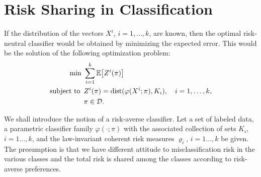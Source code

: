 \documentclass[10pt,letterpaper]{article}
\newcommand{\1}{1{\hskip -2.55 pt}\hbox{I}}
\newcommand{\dist}{\mathop{\rm dist}}
\begin{document}


\section{Risk Sharing in Classification} %
\label{sec:risk_sharing_in_classification}


If the distribution of the vectors $X^i$, $i=1,\dots, k$, are known, then the optimal risk-neutral classifier would be obtained by minimizing the expected error. 
This would be the solution of the following optimization problem:
\begin{equation}
\label{p:general-E}
\begin{aligned}
\min\, &\, \sum_{i=1}^k \mathbb E\big[ Z^i(\pi)\big]\\
\text{subject to } &\, Z^i(\pi) = \dist(\varphi(X^i;\pi),{K_i}),\quad i=1,\dots, k,\\
&\, \pi\in\mathcal D.
\end{aligned}
\end{equation}

We shall introduce the notion of a risk-averse classifier. Let a set of labeled data, a parametric classifier family
$\varphi(\cdot;\pi)$ with the associated collection of sets $K_i$, $i=1\dots,k$, and the law-invariant coherent risk measures $\varrho_i$, $i=1\dots,k$ be given. 
The presumption is that we have different attitude to misclassification risk in the various classes and the total risk is shared among the classes according to risk-averse preferences. 
\end{document}
